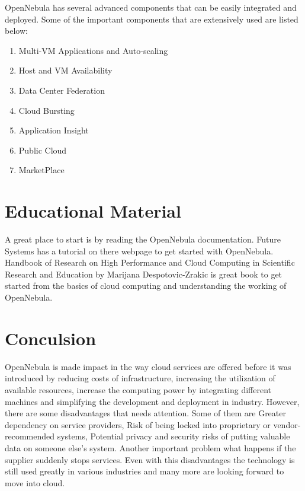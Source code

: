 \documentclass[9pt,twocolumn,twoside]{../../styles/osajnl}
\begin{document}
OpenNebula has several {advanced components}\cite{www-components} 
that can be easily 
integrated and deployed. Some of the important components that are 
extensively used are listed below:

\begin{enumerate}
	
	\item Multi-VM Applications and Auto-scaling
	\item Host and VM Availability
	\item Data Center Federation
	\item Cloud Bursting
	\item Application Insight
	\item Public Cloud
	\item MarketPlace
	
\end{enumerate}

\section{Educational Material}

A great place to start is by reading the {OpenNebula 
documentation}\cite{www-opennebula-documentation}. 
{Future Systems has a tutorial on there 
webpage}\cite{www-opennebula-tutorial} to get started with 
OpenNebula. {Handbook of Research on High Performance and Cloud 
Computing in Scientific Research and Education}\cite{book-hpc} by 
Marijana Despotovic-Zrakic is great book to get started from the 
basics of cloud computing and understanding the working of OpenNebula.

\section{Conculsion}

OpenNebula is made impact in the way cloud services are offered 
before it was introduced by reducing costs of infrastructure, 
increasing the utilization of available resources, increase the 
computing power by integrating different machines and simplifying the 
development and deployment in industry. However, there are some 
disadvantages that needs attention. Some of them are Greater 
dependency on service providers, Risk of being locked into 
proprietary or vendor-recommended systems, Potential privacy and 
security risks of putting valuable data on someone else's system. 
Another important problem what happens if the supplier suddenly stops 
services. Even with this disadvantages the technology is still used 
greatly in various industries and many more are looking forward to 
move into cloud.


\end{document}

